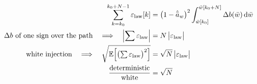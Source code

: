 \documentclass[11pt,a4paper,fontset=none]{ctexart}
\newcommand{\ba}{\bar{a}}
\newcommand{\bw}{\bar{w}}
\newcommand{\ah}{\hat{\ba}_w}
\newcommand{\E}{\mathbb{E}}
\begin{document}
\begin{align*}
\sum_{k=k_0}^{k_0+N-1}\varepsilon_{\mathrm{law}}[k]
  &= \bigl(1-\ah\bigr)^{2}\int_{\bw[k_0]}^{\bw[k_0+N]} \Delta b(\bw)\,\mathrm{d}\bw \\
\Delta b \ \text{of one sign over the path} \quad\Longrightarrow\quad
  \Bigl|\sum \varepsilon_{\mathrm{law}}\Bigr| &= N\,\bigl|\varepsilon_{\mathrm{law}}\bigr| \\
\text{white injection} \quad\Longrightarrow\quad
  \sqrt{\E\Bigl[\bigl(\textstyle\sum \varepsilon_{\mathrm{law}}\bigr)^{2}\Bigr]} &= \sqrt{N}\,\bigl|\varepsilon_{\mathrm{law}}\bigr| \\
\frac{\text{deterministic}}{\text{white}} &= \sqrt{N}
\end{align*}
\end{document}
